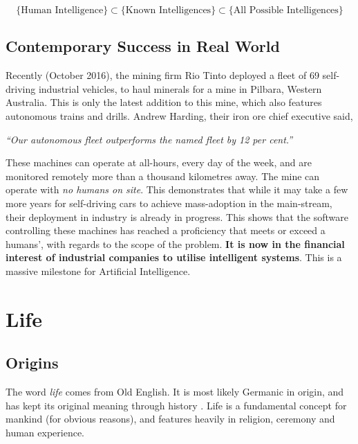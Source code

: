 \documentclass[10pt,a4paper]{article}
\begin{document}
				\medskip \[ \text{\{Human Intelligence\}}\subset\text{\{Known
				Intelligences\}}\subset\text{\{All Possible Intelligences\}} \]

			\subsection{Contemporary Success in Real World}

				Recently (October 2016), the mining firm Rio Tinto deployed a fleet of
				69 self-driving industrial vehicles, to haul minerals for a mine in
				Pilbara, Western Australia. This is only the latest addition to this
				mine, which also features autonomous trains and drills. Andrew Harding,
				their iron ore chief executive said,

				\begin{center} \textsl{``Our autonomous fleet outperforms the named
				fleet by 12 per cent.''	} \end{center}

				 These machines can operate at all-hours, every day of the week, and are
				 monitored remotely more than a thousand kilometres away. The mine can
				 operate with \textsl{no humans on site}. This demonstrates that while
				 it may take a few more years for self-driving cars to achieve
				 mass-adoption in the main-stream, their deployment in industry is
				 already in progress. This shows that the software controlling these
				 machines has reached a proficiency that meets or exceed a humans', with
				 regards to the scope of the problem. \textbf{It is now in the financial
				 interest of industrial companies to utilise intelligent systems}. This
				 is a massive milestone for Artificial Intelligence.

		\pagebreak \section{Life}

			\subsection{Origins}

				The word \textsl{life} comes from Old English. It is most likely
				Germanic in origin, and has kept its original meaning through history
				\cites{etymonline2017}. Life is a fundamental concept for mankind (for
				obvious reasons), and features heavily in religion, ceremony and human
				experience.
\end{document}
